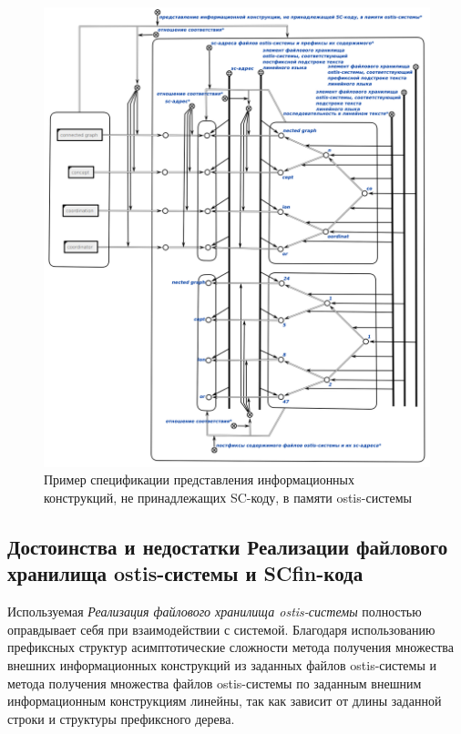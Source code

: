 \begin{figure}[htbp]
	\center
	\includegraphics[scale=0.6]{author/part6/figures/file_in_memory_representation.png}
	\caption{Пример спецификации представления информационных конструкций, не принадлежащих SC-коду, в памяти ostis-системы}
	\label{fig:file_in_memory_representation}
\end{figure}

\subsection{Достоинства и недостатки Реализации файлового хранилища ostis-системы и SCfin-кода}
\label{sec_soft_platform_scfin_code_problems}

Используемая \textit{Реализация файлового хранилища ostis-системы} полностью оправдывает себя при взаимодействии с системой. Благодаря использованию префиксных структур асимптотические сложности метода получения множества внешних информационных конструкций из заданных файлов ostis-системы и метода получения множества файлов ostis-системы по заданным внешним информационным конструкциям линейны, так как зависит от длины заданной строки и структуры префиксного дерева.

